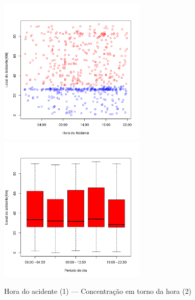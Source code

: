 \pagebreak

\begin{figure}[h]
	\caption{Hora do acidente (1) --- Concentração em torno da hora (2) }
	\includegraphics[width=7cm,height=7cm]{Figuras/Preprocess/br116_1.png}
	\includegraphics[width=7cm,height=7cm]{Figuras/Preprocess/br116_2.png}

\end{figure}

